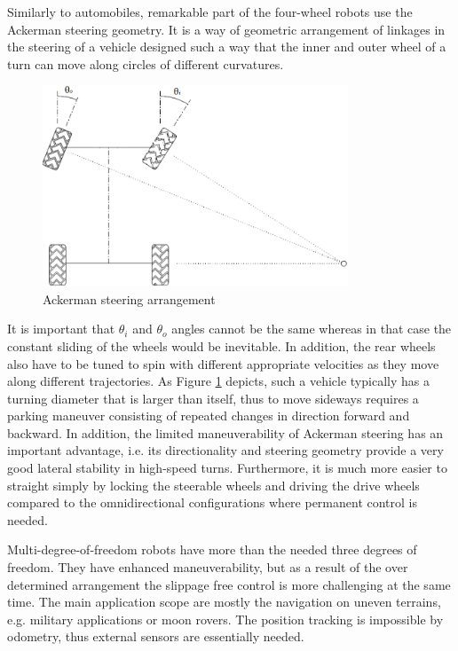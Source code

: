 \documentclass[12pt,english]{article}
\begin{document}
Similarly to automobiles, remarkable part of the four-wheel robots use the Ackerman steering geometry. It is a way of geometric arrangement of linkages in the steering of a vehicle designed such a way that the inner and outer wheel of a turn can move along circles of different curvatures. 
\begin{figure}[htb!]
	\centering
	\includegraphics[height=6cm]{figures/ackerman2.png}
	\caption{Ackerman steering arrangement}
	\label{ackerman2}
\end{figure}
It is important that ${\theta}_i$ and ${\theta}_o$ angles cannot be the same whereas in that case the constant sliding of the wheels would be inevitable. In addition, the rear wheels also have to be tuned to spin with different appropriate velocities as they move along different trajectories. As Figure \ref{ackerman2} depicts, such a vehicle typically has a turning diameter that is larger than itself, thus to move sideways requires a parking maneuver consisting of repeated changes in direction forward and backward. In addition, the limited maneuverability of Ackerman steering has an important advantage, i.e. its directionality and steering geometry provide a
very good lateral stability in high-speed turns. Furthermore, it is much more easier to straight simply by locking the steerable wheels and driving the drive wheels compared to the omnidirectional configurations where permanent control is needed.

Multi-degree-of-freedom robots have more than the needed three degrees of freedom. They have enhanced maneuverability, but as a result of the over determined arrangement the slippage free control is more challenging at the same time. The main application scope are mostly the navigation on uneven terrains, e.g. military applications or moon rovers. The position tracking is impossible by odometry, thus external sensors are essentially needed. 
\end{document}
